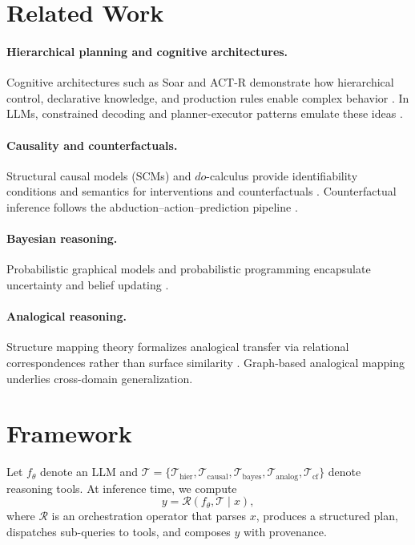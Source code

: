 \documentclass[11pt]{article}
\begin{document}
\section{Related Work}
\paragraph{Hierarchical planning and cognitive architectures.}
Cognitive architectures such as Soar and ACT-R demonstrate how hierarchical control, declarative knowledge, and production rules enable complex behavior \citep{lebiere2009actr,newell1990unified}. In LLMs, constrained decoding and planner-executor patterns emulate these ideas \citep{yao2022react}.
\paragraph{Causality and counterfactuals.}
Structural causal models (SCMs) and $do$-calculus provide identifiability conditions and semantics for interventions and counterfactuals \citep{pearl2009causality, peters2017elements}. Counterfactual inference follows the abduction--action--prediction pipeline \citep{pearl2009causality}.
\paragraph{Bayesian reasoning.}
Probabilistic graphical models and probabilistic programming encapsulate uncertainty and belief updating \citep{gelman2013bayesian, koller2009pgm}.
\paragraph{Analogical reasoning.}
Structure mapping theory formalizes analogical transfer via relational correspondences rather than surface similarity \citep{gentner1983structure, falkenhainer1989structure}. Graph-based analogical mapping underlies cross-domain generalization.

\section{Framework}
Let $f_\theta$ denote an LLM and $\mathcal{T}=\{\mathcal{T}_\mathrm{hier},\mathcal{T}_\mathrm{causal},\mathcal{T}_\mathrm{bayes},\mathcal{T}_\mathrm{analog},\mathcal{T}_\mathrm{cf}\}$ denote reasoning tools.
At inference time, we compute
\begin{equation}
y = \mathcal{R}\!\left(f_\theta, \mathcal{T} \mid x\right),
\end{equation}
where $\mathcal{R}$ is an orchestration operator that parses $x$, produces a structured plan, dispatches sub-queries to tools, and composes $y$ with provenance.
\end{document}
